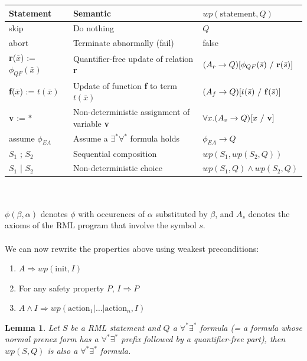 \documentclass[11pt,a4paper,oldfontcommands,openany]{memoir}
\newtheorem*{lemma}{Lemma}
\begin{document}
    \begin{tabular}{|l|l|l|}
        \hline
        Statement & Semantic & \( wp(\text{statement},Q) \) \\
        \hline
        skip & Do nothing & \(Q\) \\
        abort & Terminate abnormally (fail) & false \\
        \textbf{r}(\(\bar{x}\)) := \( \phi_{QF}(\bar{x}) \) & Quantifier-free update of relation \textbf{r} & \((A_r \rightarrow Q) [\phi_{QF}(\bar{s})\ /\ \text{\textbf{r}}(\bar{s})]\) \\
        \textbf{f}(\(\bar{x}\)) := \( t(\bar{x}) \) & Update of function \textbf{f} to term \( t(\bar{x}) \) & \((A_f \rightarrow Q) [t(\bar{s})\ /\ \text{\textbf{f}}(\bar{s})]\) \\
        \textbf{v} := \( * \) & Non-deterministic assignment of variable \textbf{v} & \(\forall x. (A_v \rightarrow Q) [x\ /\ \text{\textbf{v}}]\)\\
        assume \( \phi_{EA} \) & Assume a \( \exists^*\forall^* \) formula holds & \( \phi_{EA} \rightarrow Q \) \\
        \( S_1 \) ; \( S_2 \) & Sequential composition & \( wp(S_1, wp(S_2, Q)) \) \\
        \( S_1 \) | \( S_2 \) & Non-deterministic choice & \( wp(S_1, Q) \land wp(S_2, Q) \) \\
        \hline
    \end{tabular}\\ \\
    \( \phi(\beta,\alpha) \) denotes \(\phi\) with occurences of \(\alpha\) substituted by \(\beta\), and \(A_s\) denotes the axioms of the RML program
    that involve the symbol \(s\).\\
    \\
    We can now rewrite the properties above using weakest preconditions:
    \begin{enumerate}
        \item \(A \Rightarrow wp(\text{init},I)\)
        \item For any safety property \(P\), \(I \Rightarrow P\)
        \item \(A \land I \Rightarrow wp(\text{action}_1|\ldots|\text{action}_n,I)\)
    \end{enumerate}

    \begin{lemma}
        Let \(S\) be a RML statement and \(Q\) a \(\forall^*\exists^*\) formula (= a formula whose normal prenex form has a \(\forall^*\exists^*\) prefix followed by a quantifier-free part), then \(wp(S,Q)\) is also a \(\forall^*\exists^*\) formula.
    \end{lemma}
\end{document}
